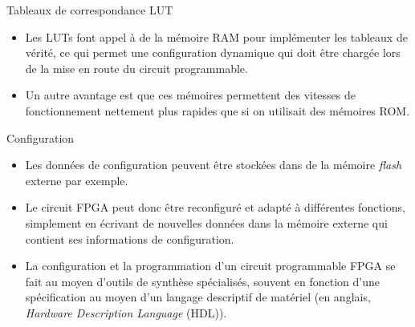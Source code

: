 \documentclass[presentation]{beamer}
\begin{document}
\begin{frame}[label={sec:orgd35ed49}]{Tableaux de correspondance LUT}
\begin{itemize}
\item Les LUTs font appel à de la mémoire RAM pour implémenter les tableaux de vérité, ce qui permet une configuration dynamique qui doit être chargée lors de la mise en route du circuit programmable.

\item Un autre avantage est que ces mémoires permettent des vitesses de fonctionnement nettement plus rapides que si on utilisait des mémoires ROM.
\end{itemize}
\end{frame}

\begin{frame}[label={sec:org29be4af}]{Configuration}
\begin{itemize}
\item Les données de configuration peuvent être stockées dans de la mémoire \emph{flash} externe par exemple.

\item Le circuit FPGA peut donc être reconfiguré et adapté à différentes fonctions, simplement en écrivant de nouvelles données dans la mémoire externe qui contient ses informations de configuration.

\item La configuration et la programmation d'un circuit programmable FPGA se fait au moyen d'outils de synthèse spécialisés, souvent en fonction d'une spécification au moyen d'un langage descriptif de matériel (en anglais, \emph{Hardware Description Language} (HDL)).
\end{itemize}
\end{frame}
\end{document}

